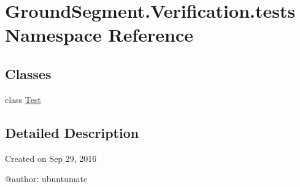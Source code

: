\hypertarget{namespace_ground_segment_1_1_verification_1_1tests}{}\section{Ground\+Segment.\+Verification.\+tests Namespace Reference}
\label{namespace_ground_segment_1_1_verification_1_1tests}
\subsection*{Classes}
\begin{DoxyCompactItemize}
\item 
class \hyperlink{class_ground_segment_1_1_verification_1_1tests_1_1_test}{Test}
\end{DoxyCompactItemize}


\subsection{Detailed Description}
\begin{DoxyVerb}Created on Sep 29, 2016

@author: ubuntumate
\end{DoxyVerb}
 